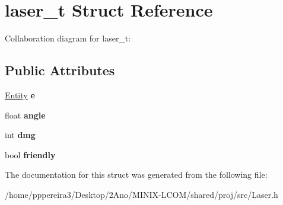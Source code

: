 \hypertarget{structlaser__t}{}\section{laser\+\_\+t Struct Reference}
\label{structlaser__t}


Collaboration diagram for laser\+\_\+t\+:
\subsection*{Public Attributes}
\begin{DoxyCompactItemize}
\item 
\hyperlink{structentity__t}{Entity} {\bfseries e}
\item 
float {\bfseries angle}
\item 
int {\bfseries dmg}
\item 
bool {\bfseries friendly}
\end{DoxyCompactItemize}


The documentation for this struct was generated from the following file\+:\begin{DoxyCompactItemize}
\item 
/home/pppereira3/\+Desktop/2\+Ano/\+M\+I\+N\+I\+X-\/\+L\+C\+O\+M/shared/proj/src/Laser.\+h\end{DoxyCompactItemize}
